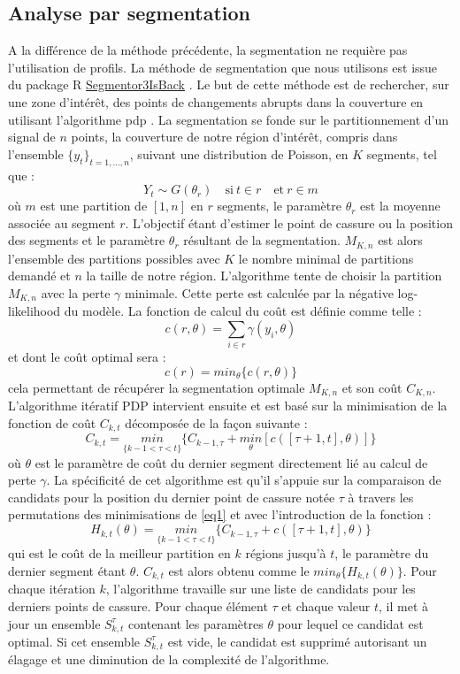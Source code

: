 \documentclass[12pt,a4paper]{report}
\begin{document}
\begin{onehalfspace}
\subsection*{Analyse par segmentation}
A la différence de la méthode précédente, la segmentation ne requière pas l'utilisation de profils. La méthode de segmentation que nous utilisons est issue du package R \href{http://cran.r-project.org/web/packages/Segmentor3IsBack/index.html}{Segmentor3IsBack} \citep{Cleynen2014}. Le but de cette méthode est de rechercher, sur une zone d'intérêt, des points de changements abrupts dans la couverture en utilisant l'algorithme \gls{pdp} \citep{Rigaill2010}. La segmentation se fonde sur le partitionnement d'un signal de $n$ points, la couverture de notre région d'intérêt, compris dans l'ensemble ${\{y_t\}_{t=1,\ldots,n}}$, suivant une distribution de Poisson, en $K$ segments, tel que :
\[ Y_t \sim G(\theta_r) \quad \text{si}\ t \in r \quad \text{et}\ r \in m \]
où $m$ est une partition de $[1,n]$ en $r$ segments, le paramètre $\theta_r$ est la moyenne associée au segment $r$. L'objectif étant d'estimer le point de cassure ou la position des segments et le paramètre $\theta_r$ résultant de la segmentation. $M_{K,n}$ est alors l'ensemble des partitions possibles avec $K$ le nombre minimal de partitions demandé et $n$ la taille de notre région. L'algorithme tente de choisir la partition $M_{K,n}$ avec la perte $\gamma$ minimale. Cette perte est calculée par la négative log-likelihood du modèle. La fonction de calcul du coût est définie comme telle :
\[ c(r,\theta) = \sum_{i \in r} \gamma(y_i,\theta) \]
et dont le coût optimal sera :
\[ c(r) = min_\theta\{c(r,\theta)\} \]
cela permettant de récupérer la segmentation optimale $M_{K,n}$ et son coût $C_{K,n}$. L'algorithme itératif PDP intervient ensuite et est basé sur la minimisation de la fonction de coût $C_{k,t}$ décomposée de la façon suivante :
\begin{equation}
\label{eq1}
C_{k,t} = \underset{\{k-1<\tau<t\}}{min} \{C_{k-1,\tau} + \underset{\theta}{min}[c([\tau + 1,t],\theta)]\}
\end{equation}
où $\theta$ est le paramètre de coût du dernier segment directement lié au calcul de perte $\gamma$. La spécificité de cet algorithme est qu'il s'appuie sur la comparaison de candidats pour la position du dernier point de cassure notée $\tau$ à travers les permutations des minimisations de \eqref{eq1} et avec l'introduction de la fonction :
\[ H_{k,t}(\theta) = \underset{\{k-1<\tau<t\}}{min} \{C_{k-1,\tau} + c([\tau + 1,t],\theta)\} \]
qui est le coût de la meilleur partition en $k$ régions jusqu'à $t$, le paramètre du dernier segment étant $\theta$. $C_{k,t}$ est alors obtenu comme le $min_\theta\{H_{k,t}(\theta)\}$.
Pour chaque itération $k$, l'algorithme travaille sur une liste de candidats pour les derniers points de cassure. Pour chaque élément $\tau$ et chaque valeur $t$, il met à jour un ensemble $S_{k,t}^\tau$ contenant les paramètres $\theta$ pour lequel ce candidat est optimal. Si cet ensemble $S_{k,t}^\tau$ est vide, le candidat est supprimé autorisant un élagage et une diminution de la complexité de l'algorithme.


\end{onehalfspace}
\end{document}

